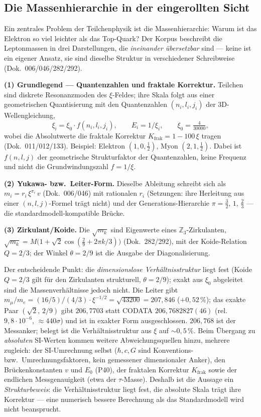 \subsection{Die Massenhierarchie in der eingerollten Sicht}

Ein zentrales Problem der Teilchenphysik ist die Massenhierarchie: Warum ist das Elektron so viel leichter als das Top-Quark? Der Korpus beschreibt die Leptonmassen in drei Darstellungen, die \emph{ineinander übersetzbar} sind --- keine ist ein eigener Ansatz, sie sind dieselbe Struktur in verschiedener Schreibweise (Dok.~006/046/282/292).

\textbf{(1) Grundlegend --- Quantenzahlen und fraktale Korrektur.} Teilchen sind diskrete Resonanzmoden des $\xi$-Feldes; ihre Skala folgt aus einer geometrischen Quantisierung mit den Quantenzahlen $(n_i,l_i,j_i)$ der 3D-Wellengleichung,
\[
  \xi_i = \xi_0\cdot f(n_i,l_i,j_i),\qquad E_i = 1/\xi_i,\qquad \xi_0=\tfrac{4}{30000},
\]
wobei die Absolutwerte die fraktale Korrektur $K_{\text{frak}}=1-100\,\xi$ tragen (Dok.~011/012/133). Beispiel: Elektron $(1,0,\tfrac12)$, Myon $(2,1,\tfrac12)$. Dabei ist $f(n,l,j)$ der geometrische Strukturfaktor der Quantenzahlen, keine Frequenz und nicht die Grundwindungszahl $f = 1/\xi$.

\textbf{(2) Yukawa- bzw.\ Leiter-Form.} Dieselbe Ableitung schreibt sich als $m_i = r_i\,\xi^{\pi_i}\,v$ (Dok.~006/046) mit rationalen $r_i$ (Setzungen: ihre Herleitung aus einer $(n,l,j)$-Formel trägt nicht) und der Generations-Hierarchie $\pi=\tfrac32,\,1,\,\tfrac23$ --- die stan\-dard\-modell-kompatible Brücke.

\textbf{(3) Zirkulant/Koide.} Die $\sqrt{m_k}$ sind Eigenwerte eines $\mathbb{Z}_3$-Zirkulanten, $\sqrt{m_k}=M\bigl(1+\sqrt2\cos(\tfrac29+2\pi k/3)\bigr)$ (Dok.~282/292), mit der Koide-Relation $Q=2/3$; der Winkel $\theta=2/9$ ist die Ausgabe der Diagonalisierung.

Der entscheidende Punkt: die \emph{dimensionslose Verhältnisstruktur} liegt fest (Koide $Q=2/3$ gilt für den Zirkulanten strukturell, $\theta=2/9$); exakt aus $\xi_0$ abgeleitet sind die Massenverhältnisse jedoch nicht. Die Leiter gibt $m_\mu/m_e=(16/5)/(4/3)\cdot\xi^{-1/2}=\sqrt{43200}=207{,}846$ ($+0{,}52\,\%$); das exakte Paar $(\sqrt2,\,2/9)$ gibt $206{,}7703$ statt CODATA $206{,}7682827(46)$ (rel.\ $9{,}8\cdot10^{-6}$, ${\approx}440\sigma$) und ist in exakter Form ausgeschlossen. $206{,}768$ ist der Messanker; belegt ist die Verhältnisstruktur aus $\xi$ auf ${\sim}0{,}5\,\%$. Beim Übergang zu \emph{absoluten} SI-Werten kommen weitere Abweichungsquellen hinzu, mehrere zugleich: der SI-Umrechnung selbst ($\hbar,c,G$ sind Konventions- bzw.\ Umrechnungsfaktoren, kein gemessener dimensionaler Anker), den Brückenkonstanten $v$ und $E_0$ (P40), der fraktalen Korrektur $K_{\text{frak}}$ sowie der endlichen Messgenauigkeit (etwa der $\tau$-Masse). Deshalb ist die Aussage ein \emph{Strukturbeweis}: die Verhältnisstruktur liegt fest, die absolute Skala trägt ihre Korrektur --- eine numerisch bessere Berechnung als das Standardmodell wird nicht beansprucht.

